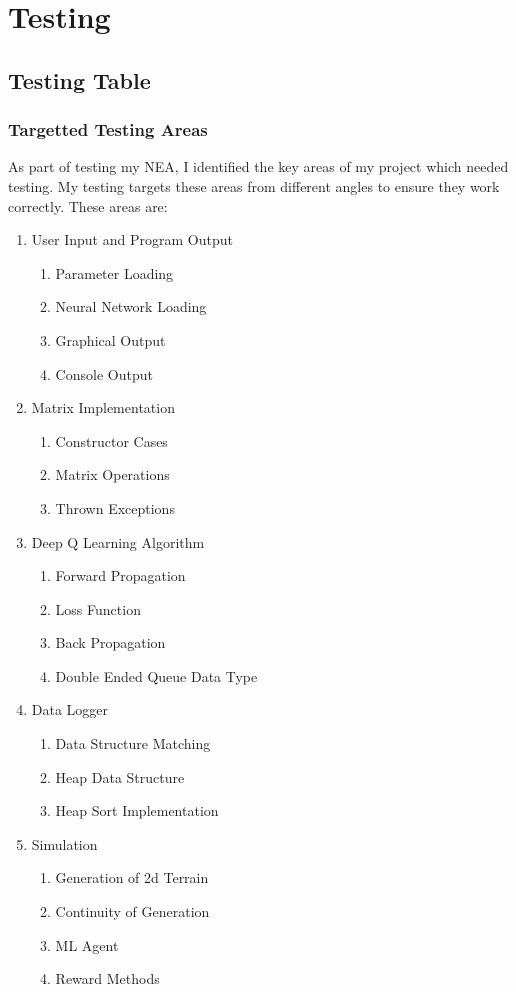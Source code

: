 \section{Testing}

\subsection{Testing Table}
\subsubsection{Targetted Testing Areas}

\large
As part of testing my NEA, I identified the key areas of my project which needed testing.
My testing targets these areas from different angles to ensure they work correctly. 
These areas are:
\begin{enumerate}
    \item User Input and Program Output
        \begin{enumerate}
            \item Parameter Loading
            \item Neural Network Loading
            \item Graphical Output
            \item Console Output
        \end{enumerate}
    \item Matrix Implementation
        \begin{enumerate}
            \item Constructor Cases
            \item Matrix Operations
            \item Thrown Exceptions
        \end{enumerate}
    \item Deep Q Learning Algorithm
        \begin{enumerate}
            \item Forward Propagation
            \item Loss Function
            \item Back Propagation
            \item Double Ended Queue Data Type
        \end{enumerate}
    \item Data Logger
        \begin{enumerate}
            \item Data Structure Matching
            \item Heap Data Structure
            \item Heap Sort Implementation
        \end{enumerate}
    \item Simulation
        \begin{enumerate}
            \item Generation of 2d Terrain
            \item Continuity of Generation
            \item ML Agent
            \item Reward Methods
        \end{enumerate}
\end{enumerate}

